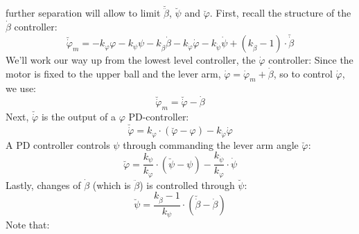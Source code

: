 \documentclass{article}
\begin{document}
further separation will allow to limit $\breve{\ddot{\beta}}$, $\breve{\psi}$ and $\breve{\varphi}$.
First, recall the structure of the $\dot{\beta}$ controller:
\begin{equation}
\breve{\dot{\varphi}}_m=- k_{\varphi} \varphi - k_{\psi}\psi - k_{\dot{\beta}}\dot{\beta} - k_{\dot{\varphi}} \dot{\varphi} - k_{\dot{\psi}} \dot{\psi} + \left(k_{\dot{\beta}} - 1 \right) \cdot \breve{\dot{\beta}}
\label{eq:betadotctrl2}
\end{equation}
We'll work our way up from the lowest level controller, the $\dot{\varphi}$ controller:
Since the motor is fixed to the upper ball and the lever arm, $\dot{\varphi} = \dot{\varphi}_m + \dot{\beta}$, so to control $\dot{\varphi}$, we use:
\begin{equation}
\breve{\dot{\varphi}}_m = \breve{\dot{\varphi}} - \dot{\beta}
\end{equation}
Next, $\breve{\dot{\varphi}}$ is the output of a $\varphi$ PD-controller:
\begin{equation}
\breve{\dot{\varphi}} = k_{\varphi} \cdot \left( \breve{\varphi} - \varphi \right) - k_{\dot{\varphi}} \dot{\varphi}
\end{equation}
A PD controller controls $\psi$ through commanding the lever arm angle $\breve{\varphi}$:
\begin{equation}
\breve{\varphi} =  \frac{k_{\psi}}{k_{\varphi}}  \cdot \left( \breve{\psi} - \psi \right) - \frac{k_{\dot{\psi}}}{k_{\varphi}} \cdot \dot{\psi}
\end{equation}
Lastly, changes of $\dot{\beta}$ (which is $\ddot{\beta}$) is controlled through $\breve{\psi}$:
\begin{equation}
\breve{\psi} = \frac{k_{\dot{\beta}} - 1}{k_{\psi}}  \cdot \left( \breve{\dot{\beta}} - \dot{\beta} \right)
\end{equation}
Note that:
\end{document}
